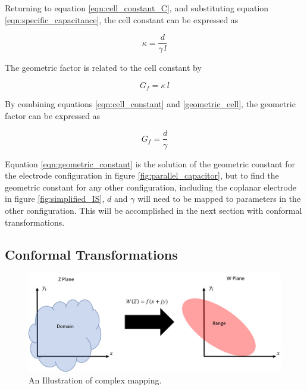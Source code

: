   \par Returning to equation \ref{eqn:cell_constant_C}, and substituting equation \ref{eqn:specific_capacitance}, the cell constant can be expressed as 
  
  \begin{equation}
      \kappa = \frac{d}{\gamma \, l}
      \label{eqn:cell_constant}
  \end{equation}
  
  \noindent The geometric factor is related to the cell constant by 
  
  \begin{equation}
       G_f = \kappa \,l
       \label{geometric_cell}
  \end{equation}

  \noindent By combining equations \ref{eqn:cell_constant} and \ref{geometric_cell}, the geometric factor can be expressed as
  
  \begin{equation}
      G_f = \frac{d}{\gamma}
      \label{eqn:geometric_constant}
  \end{equation}
  
  \par Equation \ref{eqn:geometric_constant} is the solution of the geometric constant for the electrode configuration in figure \ref{fig:parallel_capacitor}, but to find the geometric constant for any other configuration, including the coplanar electrode in figure \ref{fig:simplified_IS}, $d$ and $\gamma$ will need to be mapped to parameters in the other configuration. This will be accomplished in the next section with conformal transformations.
  
  
  \subsection{Conformal Transformations}
  
  \begin{figure}[h]
  \centering
  \includegraphics[width=\textwidth]{images/mapping.png}
  \caption[Illustration of complex mapping.]{An Illustration of complex mapping.}
  \label{fig:mapping}
  \end{figure}
  
